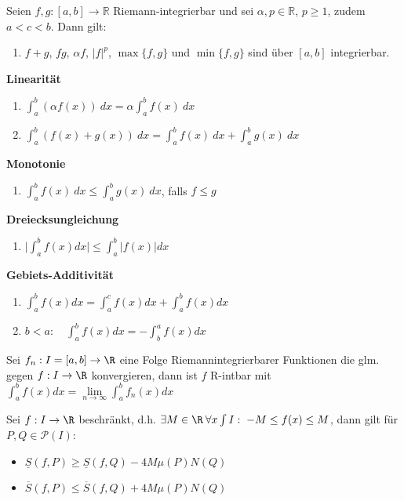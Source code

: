 \begin{theorem}

Seien $f,g: [a,b]\rightarrow \mathbb{R}$ Riemann-integrierbar und sei $\alpha,p \in \mathbb{R}$, $p \geq 1$, zudem $a<c<b$. Dann gilt:
		
	\begin{enumerate}
		\item $f+g$, $fg$, $\alpha f$, $|f|^p$, $\max\{f,g\}$ und $\min\{f,g\}$  sind über $[a,b]$ integrierbar.
	\end{enumerate}
	
	\textbf{Linearität}
	\begin{enumerate}[resume]
		\item $\int_{a}^{b}(\alpha f(x)) \ dx = \alpha \int_{a}^{b}f(x) \ dx $
		
		\item $\int_{a}^{b} (f(x)+g(x)) \ dx = \int_{a}^{b}f(x) \ dx + \int_{a}^{b}g(x) \ dx$
	\end{enumerate}	
	
	\textbf{Monotonie}
	\begin{enumerate}[resume]
		\item $\int_{a}^{b}f(x) \ dx \leq \int_{a}^{b}g(x) \ dx $, falls $f \leq g$
	\end{enumerate}
	
	\textbf{Dreiecksungleichung}
	\begin{enumerate}[resume]
		\item $\big|\int_{a}^{b} f(x) dx\big| \leq \int_{a}^{b}|f(x)| dx$
	\end{enumerate}

	\textbf{Gebiets-Additivität}
	\begin{enumerate}[resume]
		\item $\int_{a}^{b}f(x) dx = \int_{a}^{c} f(x) dx + \int_{a}^{b}f(x) dx$
        \item $b<a: \quad \int_{a}^{b}f(x) dx = -\int_{b}^{a}f(x) dx$
	\end{enumerate}
\end{theorem}

\begin{theorem}
Sei $f_n: I=[a,b] \to \R$ eine Folge Riemannintegrierbarer Funktionen die glm. gegen $f: I\to\R$ konvergieren, dann ist $f$ R-intbar mit $\int_a^b f(x) dx =\lim\limits_{n\to \infty} \int_a^b f_n(x) dx$
\end{theorem}

\begin{theorem}
Sei $f: I \to \R$ beschränkt, d.h. $\exists M\in\R\:\forall x\int I:\; -M \leq f(x) \leq M$, dann gilt für $P,Q\in\mathcal{P}(I)$:
\begin{itemize}
\item $\underline{S}(f,P)\geq \underline{S}(f,Q) - 4M\mu(P)N(Q)$
\item $\overline{S}(f,P)\leq \overline{S}(f,Q) + 4M\mu(P)N(Q)$
\end{itemize}
\end{theorem}

